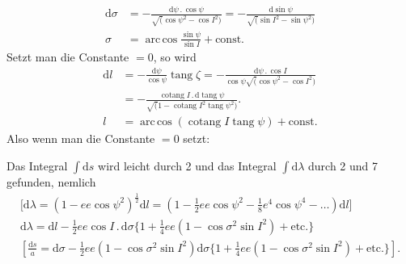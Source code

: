 \par\clearpage
\noindent\makebox[12mm][l]{}\par\medskip

\[
\begin{aligned}
\mathrm d\sigma
&=-\frac{\mathrm d\psi\,.\,\cos\psi}{\surd(\cos\psi^2-\cos I^2)}
=-\frac{\mathrm d\sin\psi}{\surd(\sin I^2-\sin\psi^2)}\\
\sigma&=\operatorname{arc\,cos}\frac{\sin\psi}{\sin I}+\text{const.}
\end{aligned}
\]
\noindent Setzt man die Constante \(=0\), so wird
\[
\begin{aligned}
\mathrm dl&=-\frac{\mathrm d\psi}{\cos\psi}\operatorname{tang}\zeta
=-\frac{\mathrm d\psi\,.\,\cos I}{\cos\psi\surd(\cos\psi^2-\cos I^2)}\\
&=-\frac{\operatorname{cotang}I\,.\,\mathrm d\operatorname{tang}\psi}
{\surd(1-\operatorname{cotang}I^2\operatorname{tang}\psi^2)}.\\
l&=\operatorname{arc\,cos}(\operatorname{cotang}I\operatorname{tang}\psi)+\text{const.}
\end{aligned}
\]
\noindent Also wenn man die Constante \(=0\) setzt:
\noindent [folglich]

\noindent Das Integral \(\int\mathrm ds\) wird leicht durch 2 und das Integral \(\int\mathrm d\lambda\)
durch 2 und 7 gefunden, nemlich
\[
\begin{gathered}
{[}\mathrm d\lambda=(1-ee\cos\psi^2)^{\frac12}\mathrm dl
=(1-\tfrac12 ee\cos\psi^2-\tfrac18e^4\cos\psi^4-\ldots)\mathrm dl]\\
\mathrm d\lambda=\mathrm dl-\tfrac12ee\cos I\,.\,\mathrm d\sigma
\{1+\tfrac14 ee(1-\cos\sigma^2\sin I^2)+\text{etc.}\}\\
\left[\frac{\mathrm ds}a=\mathrm d\sigma-\tfrac12ee(1-\cos\sigma^2\sin I^2)\mathrm d\sigma
\{1+\tfrac14 ee(1-\cos\sigma^2\sin I^2)+\text{etc.}\}\right].
\end{gathered}
\]

